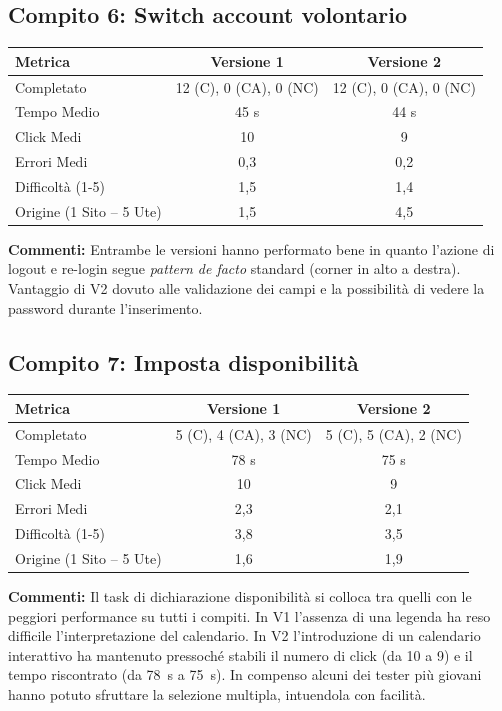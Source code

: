 \subsection{Compito 6: Switch account volontario}
\begin{table}[H]
\centering
\renewcommand{\arraystretch}{1.2}
\small
\begin{tabular}{|l|c|c|}
\hline
\textbf{Metrica} & \textbf{Versione 1} & \textbf{Versione 2} \\
\hline
Completato & 12 (C), 0 (CA), 0 (NC) & 12 (C), 0 (CA), 0 (NC) \\ \hline
Tempo Medio & 45 s & 44 s \\ \hline
Click Medi & 10 & 9 \\ \hline
Errori Medi & 0,3 & 0,2 \\ \hline
Difficoltà (1-5) & 1,5 & 1,4 \\ \hline
Origine (1 Sito -- 5 Ute) & 1,5 & 4,5 \\ \hline
\end{tabular}
\end{table}
\textbf{Commenti:} Entrambe le versioni hanno performato bene in quanto l'azione di logout e re-login segue \textit{pattern de facto} standard (corner in alto a destra). Vantaggio di V2 dovuto alle validazione dei campi e la possibilità di vedere la password durante l'inserimento.

\subsection{Compito 7: Imposta disponibilità}
\begin{table}[H]
\centering
\renewcommand{\arraystretch}{1.2}
\small
\begin{tabular}{|l|c|c|}
\hline
\textbf{Metrica} & \textbf{Versione 1} & \textbf{Versione 2} \\
\hline
Completato & 5 (C), 4 (CA), 3 (NC) & 5 (C), 5 (CA), 2 (NC) \\ \hline
Tempo Medio & 78 s & 75 s \\ \hline
Click Medi & 10 & 9 \\ \hline
Errori Medi & 2,3 & 2,1 \\ \hline
Difficoltà (1-5) & 3,8 & 3,5 \\ \hline
Origine (1 Sito -- 5 Ute) & 1,6 & 1,9 \\ \hline
\end{tabular}
\end{table}
\textbf{Commenti:} Il task di dichiarazione disponibilità si colloca tra quelli con le peggiori performance su tutti i compiti. In V1 l'assenza di una legenda ha reso difficile l'interpretazione del calendario. In V2 l'introduzione di un calendario interattivo ha mantenuto pressoché stabili il numero di click (da 10 a 9) e il tempo riscontrato (da 78~s a 75~s). In compenso alcuni dei tester più giovani hanno potuto sfruttare la selezione multipla, intuendola con facilità.

